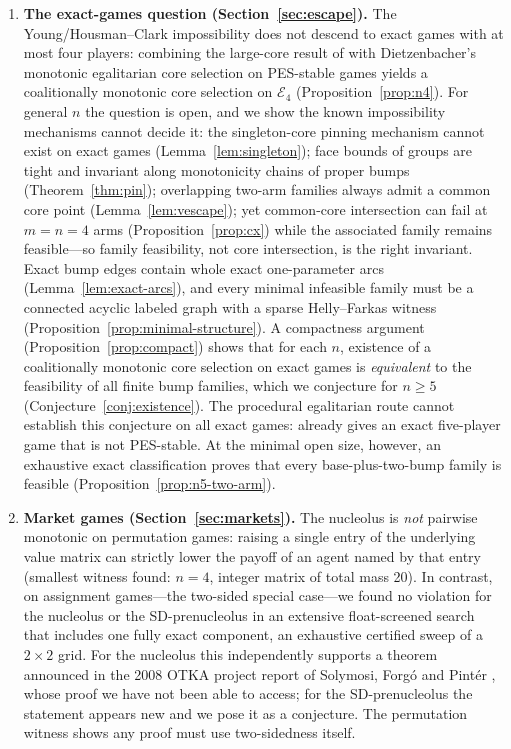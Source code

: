 \documentclass[11pt]{article}
\begin{document}
\begin{enumerate}[leftmargin=2em]
\item \textbf{The exact-games question (Section~\ref{sec:escape}).}
The Young/Housman--Clark impossibility does not descend to exact games with
at most four players: combining the large-core result of \citet{Biswas99} with Dietzenbacher's monotonic egalitarian core
selection on PES-stable games \citep{Dietzenbacher2021} yields a
coalitionally monotonic core selection on $\mathcal{E}_4$
(Proposition~\ref{prop:n4}). For general $n$ the question is open, and we
show the known impossibility mechanisms cannot decide it: the singleton-core
pinning mechanism cannot exist on exact games (Lemma~\ref{lem:singleton});
face bounds of groups are tight and invariant along monotonicity chains of
proper bumps (Theorem~\ref{thm:pin}); overlapping two-arm families always
admit a common core point (Lemma~\ref{lem:vescape}); yet common-core
intersection can fail at $m=n=4$ arms (Proposition~\ref{prop:cx}) while the
associated family remains feasible---so family feasibility, not core
intersection, is the right invariant. Exact bump edges contain whole exact
one-parameter arcs (Lemma~\ref{lem:exact-arcs}), and every minimal infeasible
family must be a connected acyclic labeled graph with a sparse Helly--Farkas
witness (Proposition~\ref{prop:minimal-structure}). A compactness argument
(Proposition~\ref{prop:compact}) shows that for each $n$, existence of a
coalitionally monotonic core selection on exact games is \emph{equivalent}
to the feasibility of all finite bump families, which we conjecture for
$n\ge5$ (Conjecture~\ref{conj:existence}). The procedural egalitarian route
cannot establish this conjecture on all exact games:
\citet[][Example~5]{Mauri2017} already gives an exact five-player game that
is not PES-stable. At the minimal open size, however, an exhaustive exact
classification proves that every base-plus-two-bump family is feasible
(Proposition~\ref{prop:n5-two-arm}).

\item \textbf{Market games (Section~\ref{sec:markets}).}
The nucleolus is \emph{not} pairwise monotonic on permutation games: raising
a single entry of the underlying value matrix can strictly lower the payoff
of an agent named by that entry (smallest witness found: $n=4$, integer
matrix of total mass 20). In contrast, on assignment games---the two-sided
special case---we found no violation for the nucleolus or the
SD-prenucleolus in an extensive float-screened search that includes one
fully exact component, an exhaustive certified sweep of a $2\times2$ grid. For the nucleolus this independently
supports a theorem announced in the 2008 OTKA project report of Solymosi,
Forg\'o and Pint\'er \citep{SFP2008}, whose proof we have not been able to
access; for the SD-prenucleolus the statement appears new and we pose it as a
conjecture. The permutation witness shows any proof must use two-sidedness
itself.
\end{enumerate}
\end{document}
